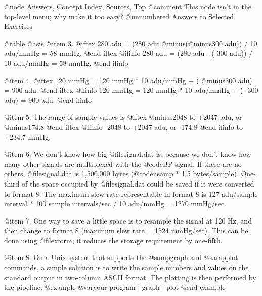 {{{{{{{{{@node     Answers, Concept Index, Sources, Top
@comment This node isn't in the top-level menu;  why make it too easy?
@unnumbered Answers to Selected Exercises

@table @asis
@item 3.
@iftex
280 adu = (280 adu @minus{}(@minus{}300 adu)) / 10 adu/mmHg = 58 mmHg.
@end iftex
@ifinfo
280 adu = (280 adu - (-300 adu)) / 10 adu/mmHg = 58 mmHg.
@end ifinfo

@item 4.
@iftex
120 mmHg = 120 mmHg * 10 adu/mmHg + ( @minus{}300 adu) = 900 adu.
@end iftex
@ifinfo
120 mmHg = 120 mmHg * 10 adu/mmHg + (- 300 adu) = 900 adu.
@end ifinfo

@item 5.
The range of sample values is
@iftex
@minus{}2048 to +2047 adu, or @minus{}174.8
@end iftex
@ifinfo
-2048 to +2047 adu, or -174.8
@end ifinfo
to +234.7 mmHg.

@item 6.
We don't know how big @file{signal.dat} is, because we don't know how
many other signals are multiplexed with the @code{BP} signal.  If there
are no others, @file{signal.dat} is 1,500,000 bytes (@code{nsamp} * 1.5
bytes/sample).  One-third of the space occupied by @file{signal.dat} could be
saved if it were converted to format 8.  The maximum slew rate
representable in format 8 is 127 adu/sample interval * 100 sample
intervals/sec / 10 adu/mmHg = 1270 mmHg/sec.

@item 7.
One way to save a little space is to resample the signal at 120 Hz, and
then change to format 8 (maximum slew rate = 1524 mmHg/sec).  This can be
done using @file{xform};  it reduces the storage requirement by
one-fifth.

@item 8.
On a Unix system that supports the @samp{graph} and @samp{plot}
commands, a simple solution is to write the sample numbers and values on
the standard output in two-column ASCII format.  The plotting is then
performed by the pipeline:
@example
@var{your-program} | graph | plot
@end example

}}}}}}}}}
